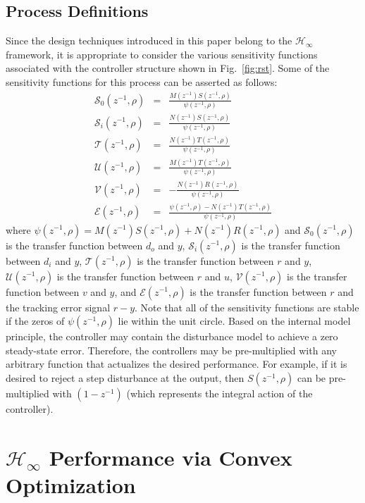 \documentclass[a4paper, 10pt, conference]{ieeeconf}
\begin{document}
\subsection{Process Definitions}
\label{sec:23}
Since the design techniques introduced in this paper belong to the $\mathcal{H}_{\infty}$ framework, it is  appropriate to consider the various sensitivity functions associated with the controller structure shown in Fig.~\ref{fig:rst}. Some of the sensitivity functions for this process can be asserted as follows:
\begin{eqnarray}
\mathcal{S}_0(z^{-1},\rho)&=&\frac{M(z^{-1})S(z^{-1},\rho)}{\psi(z^{-1},\rho)}  \label{eq:S0}\\
\mathcal{S}_i(z^{-1},\rho)&=&\frac{N(z^{-1})S(z^{-1},\rho)}{\psi(z^{-1},\rho)} \\
\mathcal{T}(z^{-1},\rho)&=&\frac{N(z^{-1})T(z^{-1},\rho)}{\psi(z^{-1},\rho)} \label{eq:T} \\
\mathcal{U}(z^{-1},\rho)&=&\frac{M(z^{-1})T(z^{-1},\rho)}{\psi(z^{-1},\rho)} \label{eq:U}\\
\mathcal{V}(z^{-1},\rho)&=& -\frac{N(z^{-1})R(z^{-1},\rho)}{\psi(z^{-1},\rho)} \\
\mathcal{E}(z^{-1},\rho)&=&\frac{\psi(z^{-1},\rho) - N(z^{-1})T(z^{-1},\rho)}{\psi(z^{-1},\rho)} \label{eq:err}
\end{eqnarray}
where $\psi(z^{-1},\rho) = M(z^{-1})S(z^{-1},\rho)+N(z^{-1})R(z^{-1},\rho)$ and $\mathcal{S}_0(z^{-1},\rho)$ is the transfer function between $d_o$ and $y$, $\mathcal{S}_i(z^{-1},\rho)$ is the transfer function between $d_i$ and $y$, $\mathcal{T}(z^{-1},\rho)$ is the transfer function between $r$ and $y$, $\mathcal{U}(z^{-1},\rho)$ is the transfer function between $r$ and $u$, $\mathcal{V}(z^{-1},\rho)$ is the transfer function between $v$ and $y$, and $\mathcal{E}(z^{-1},\rho)$ is the transfer function between $r$ and the tracking error signal $r-y$. Note that all of the sensitivity functions are stable if the zeros of $\psi(z^{-1},\rho)$ lie within the unit circle. Based on the internal model principle, the controller may contain the disturbance model to achieve a zero steady-state error. Therefore, the controllers may be pre-multiplied with any arbitrary function that actualizes the desired performance. For example, if it is desired to reject a step disturbance at the output, then $S(z^{-1},\rho)$ can be pre-multiplied with $(1-z^{-1})$ (which represents the integral action of the controller). 


\section{$\mathcal{H}_{\infty}$ Performance via Convex Optimization}
\label{sec:3}
\end{document}
